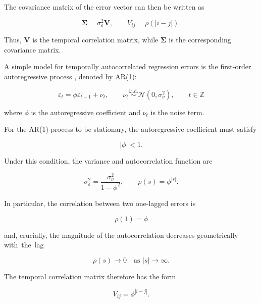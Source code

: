 \documentclass[english]{pwr_wmat_praca_dyplomowa}
\theoremstyle{definition}
\theoremstyle{remark}
\begin{document}
The covariance matrix of the error vector can then be written as

\begin{equation}
    \boldsymbol{\Sigma} = \sigma_\varepsilon^2\mathbf{V}, \qquad V_{ij} = \rho(|i-j|).
\end{equation}

Thus, $\mathbf{V}$ is the temporal correlation matrix, while $\boldsymbol{\Sigma}$ is the corresponding covariance matrix.

A simple model for temporally autocorrelated regression errors is the first-order autoregressive process \cite{ols-ar-connection}, denoted by AR(1):

\begin{equation}
    \varepsilon_t = \phi\varepsilon_{t-1} + \nu_t, \qquad \nu_t \overset{\mathrm{i.i.d.}}{\sim} \mathcal{N} \left(0, \sigma_\nu^2 \right), \qquad t \in \mathbb{Z}
\end{equation}

where $\phi$ is the autoregressive coefficient and $\nu_t$ is the noise term.

For the AR(1) process to be stationary, the autoregressive coefficient must satisfy 

\begin{equation}
    |\phi| < 1.
\end{equation}

Under this condition, the variance and autocorrelation function are \cite{ols-ar-connection}

\begin{equation}
    \sigma_\varepsilon^2 = \frac{\sigma_\nu^2}{1-\phi^2}, \qquad \rho(s) = \phi^{|s|}.
\end{equation}

In particular, the correlation between two one-lagged errors is

\begin{equation}
    \rho(1)=\phi
\end{equation}

and, crucially, the magnitude of the autocorrelation decreases geometrically with~the~lag

\begin{equation}
    \rho(s) \longrightarrow 0 \quad \text{as } |s|\longrightarrow\infty.
\end{equation}

The temporal correlation matrix therefore has the form

\begin{equation}
    V_{ij} = \phi^{|i-j|}.
\end{equation}
\end{document}
